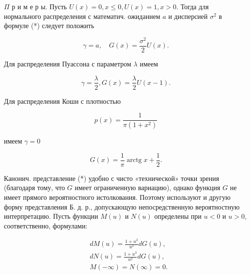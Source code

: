 \documentclass[10pt]{article}
\begin{document}
$\Pi$ р и м е р ы. Пусть $U(x)=0, x \leqslant 0, U(x)=1, x>0$. Тогда для нормального распределения с математич. ожиданием $a$ и дисперсией $\sigma^{2}$ в формуле (*) следует положить



\[

\gamma=a, \quad G(x)=\frac{\sigma^{2}}{2} U(x) .

\]



Для распределения Пуассона с параметром $\lambda$ имеем



\[

\gamma=\frac{\lambda}{2}, G(x)=\frac{\lambda}{2} U(x-1) .

\]



Для распределения Коши с плотностью



\[

p(x)=\frac{1}{\pi\left(1+x^{2}\right)}

\]



имеем $\gamma=0$



\[

G(x)=\frac{1}{\pi} \operatorname{arctg} x+\frac{1}{2} .

\]



Канонич. представление (*) удобно с чисто «технической» точки зрения (благодаря тому, что $G$ имеет ограниченную вариацию), однако функция $G$ не имеет прямого вероятностного истолкования. Поэтому используют и другую форму представления Б. д. р., допускающую непосредственную вероятностную интерпретацию. Пусть функции $M(u)$ и $N(u)$ определены при $u<0$ и $u>0$, соответственно, формулами:



\[

\begin{aligned}

& d M(u)=\frac{1+u^{2}}{u^{2}} d G(u), \\

& d N(u)=\frac{1+u^{2}}{u^{2}} d G(u), \\

& M(-\infty)=N(\infty)=0 .

\end{aligned}

\]
\end{document}
